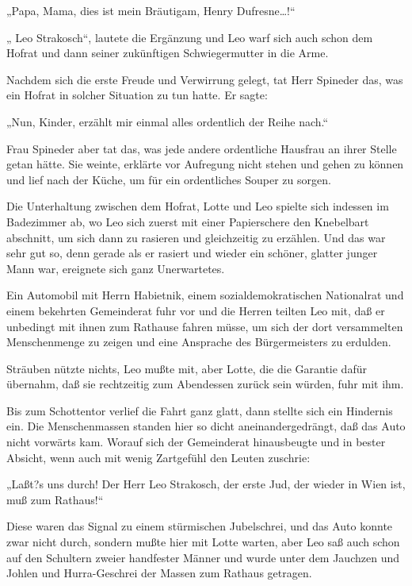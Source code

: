 „Papa, Mama, dies ist mein Bräutigam, Henry Dufresne\ldots{}!“

„ Leo Strakosch“, lautete die Ergänzung und Leo warf
sich auch schon dem Hofrat und dann seiner zukünftigen
Schwiegermutter in die Arme.

Nachdem sich die erste Freude und Verwirrung gelegt, tat Herr
Spineder das, was ein Hofrat in solcher Situation zu tun hatte. Er
sagte:

„Nun, Kinder, erzählt mir einmal alles ordentlich der Reihe nach.“

Frau Spineder aber tat das, was jede andere ordentliche Hausfrau an
ihrer Stelle getan hätte. Sie weinte, erklärte vor Aufregung nicht
stehen und gehen zu können und lief nach der Küche, um für ein
ordentliches Souper zu sorgen.

Die Unterhaltung zwischen dem Hofrat, Lotte und Leo spielte sich
indessen im Badezimmer ab, wo Leo sich zuerst mit einer
Papierschere den Knebelbart abschnitt, um sich dann zu rasieren und
gleichzeitig zu erzählen. Und das war sehr gut so, denn gerade als
er rasiert und wieder ein schöner, glatter junger Mann war,
ereignete sich ganz Unerwartetes.

Ein Automobil mit Herrn Habietnik, einem sozialdemokratischen
Nationalrat und einem bekehrten Gemeinderat  fuhr
vor und die Herren teilten Leo mit, daß er unbedingt mit ihnen zum
Rathause fahren müsse, um sich der dort versammelten Menschenmenge
zu zeigen und eine Ansprache des Bürgermeisters zu erdulden.

Sträuben nützte nichts, Leo mußte mit, aber Lotte, die die Garantie
dafür übernahm, daß sie rechtzeitig zum Abendessen zurück sein
würden, fuhr mit ihm.

Bis zum Schottentor verlief die Fahrt ganz glatt, dann stellte sich
ein Hindernis ein. Die Menschenmassen standen hier so dicht
aneinandergedrängt, daß das Auto nicht vorwärts kam. Worauf sich
der Gemeinderat hinausbeugte und in bester Absicht, wenn auch mit
wenig Zartgefühl den Leuten zuschrie:

„Laßt?s uns durch! Der Herr Leo Strakosch, der erste Jud, der
wieder in Wien ist, muß zum Rathaus!“

Diese  waren das Signal zu einem stürmischen
Jubelschrei, und das Auto konnte zwar nicht durch, sondern mußte
hier mit Lotte warten, aber Leo saß auch schon auf den Schultern
zweier handfester Männer und wurde unter dem Jauchzen und Johlen
und Hurra-Geschrei der Massen zum Rathaus getragen.

